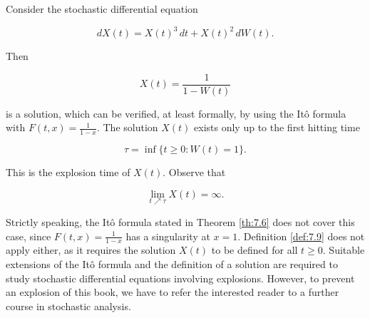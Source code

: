 \begin{Example}
\label{ex:7-explosion-example}
Consider the stochastic differential equation

\begin{equation}
dX(t) = X(t)^3 \, dt + X(t)^2 \, dW(t).
\label{eq:SDE_explosion}
\end{equation}

Then

\begin{equation}
X(t) = \frac{1}{1 - W(t)}
\label{eq:SDE_explosion_solution}
\end{equation}

is a solution, which can be verified, at least formally, by using the Itô formula with $F(t, x) = \frac{1}{1-x}$. The solution $X(t)$ exists only up to the first hitting time

\begin{equation}
\tau = \inf\{t \geq 0: W(t) = 1\}.
\end{equation}

This is the explosion time of $X(t)$. Observe that

\begin{equation}
\lim_{t \nearrow \tau} X(t) = \infty.
\end{equation}

Strictly speaking, the Itô formula stated in Theorem \ref{th:7.6} does not cover this case, since $F(t, x) = \frac{1}{1-x}$ has a singularity at $x = 1$. Definition \ref{def:7.9} does not apply either, as it requires the solution $X(t)$ to be defined for all $t \geq 0$. Suitable extensions of the Itô formula and the definition of a solution are required to study stochastic differential equations involving explosions. However, to prevent an explosion of this book, we have to refer the interested reader to a further course in stochastic analysis.
\end{Example}


